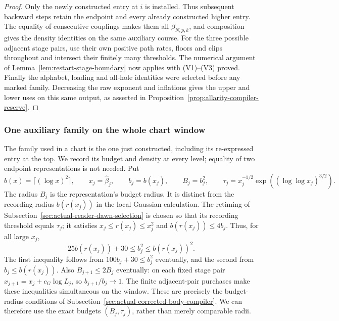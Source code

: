 \begin{proof}
Only the newly constructed entry at $i$ is installed. Thus subsequent
backward steps retain the endpoint and every already constructed
higher entry. The equality of consecutive couplings makes them all
$\beta_{N,p,k}$, and composition gives the density identities on the
same auxiliary course. For the three possible adjacent stage pairs,
use their own positive path rates, floors and clips throughout and
intersect their finitely many thresholds. The numerical argument of
Lemma~\ref{lem:restart-stage-boundary} now applies with (V1)--(V3)
proved. Finally the alphabet, loading and all-hole identities were
selected before any marked family. Decreasing the raw exponent and
inflations gives the upper and lower uses on this same output,
as asserted in Proposition~\ref{prop:allarity-compiler-reserve}.
\end{proof}

\subsubsection{One auxiliary family on the whole chart window}
\label{subsec:restart-chart-family}

The family used in a chart is the one just constructed, including its
re-expressed entry at the top. We record its budget and density at every
level; equality of two endpoint representations is not needed.
Put
\[
 b(x)=\lceil(\log x)^2\rceil,\qquad
 x_j=\widehat\beta_j,\qquad b_j=b(x_j),
 \qquad B_j=b_j^2,\qquad
 \tau_j=x_j^{-1/2}\exp((\log\log x_j)^{3/2}).
\]
The radius $B_j$ is the representation's budget radius. It is distinct
from the recording radius $b(r(x_j))$ in the local Gaussian calculation.
The retiming of Subsection~\ref{sec:actual-reader-dawn-selection} is chosen
so that its recording threshold equals $\tau_j$; it satisfies
$x_j\le r(x_j)\le x_j^2$ and $b(r(x_j))\le4b_j$.
Thus, for all large $x_j$,
\[
 25b(r(x_j))+30\le b_j^2\le b(r(x_j))^2.
\]
The first inequality follows from $100b_j+30\le b_j^2$ eventually,
and the second from $b_j\le b(r(x_j))$. Also
$B_{j+1}\le2B_j$ eventually: on each fixed stage pair
$x_{j+1}=x_j+c_G\log L_j$, so $b_{j+1}/b_j\to1$.
The finite adjacent-pair purchases make these inequalities simultaneous
on the window. These are precisely the budget-radius conditions of
Subsection~\ref{sec:actual-corrected-body-compiler}. We can therefore use
the exact budgets $(B_j,\tau_j)$, rather than merely comparable radii.

